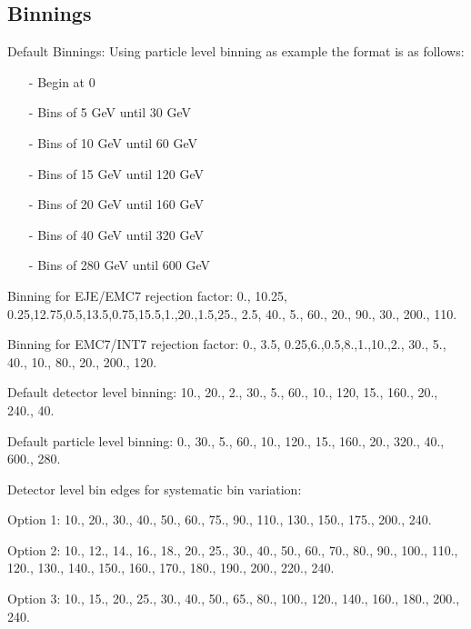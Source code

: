 \documentclass[ALICE]{ALICE_analysis_notes}
\begin{document}
\begin{appendix}
\newpage

\section{Binnings}
\label{sec:appendixSysBinVar}

Default Binnings:
Using particle level binning as example the format is as follows:
\begin{itemize}
    \item[-] Begin at 0
    \item[-] Bins of 5 GeV until 30 GeV
    \item[-] Bins of 10 GeV until 60 GeV
    \item[-] Bins of 15 GeV until 120 GeV
    \item[-] Bins of 20 GeV until 160 GeV
    \item[-] Bins of 40 GeV until 320 GeV
    \item[-] Bins of 280 GeV until 600 GeV
\end{itemize}

Binning for EJE/EMC7 rejection factor:
0., {{10.25, 0.25},{12.75,0.5},{13.5,0.75},{15.5,1.},{20.,1.5},{25., 2.5}, {40., 5.}, {60., 20.}, {90., 30.}, {200., 110.}}

\bigskip

Binning for EMC7/INT7 rejection factor:
0., {{3.5, 0.25},{6.,0.5},{8.,1.},{10.,2.}, {30., 5.}, {40., 10.}, {80., 20.}, {200., 120.}}

\bigskip

Default detector level binning:
10., {{20., 2.}, {30., 5.}, {60., 10.}, {120, 15.}, {160., 20.}, {240., 40.}}

\bigskip

Default particle level binning:
0., {{30., 5.}, {60., 10.}, {120., 15.}, {160., 20.}, {320., 40.}, {600., 280.}}

\bigskip

Detector level bin edges for systematic bin variation:

\bigskip

Option 1:
10., 20., 30., 40., 50., 60., 75., 90., 110., 130., 150., 175., 200., 240.

\bigskip

Option 2:
10., 12., 14., 16., 18., 20., 25., 30., 40., 50., 60., 70., 80., 90., 100., 110., 120., 130., 140., 150., 160., 170., 180., 190., 200., 220., 240.

\bigskip

Option 3:
10., 15., 20., 25., 30., 40., 50., 65., 80., 100., 120., 140., 160., 180., 200., 240.


\end{appendix}
\end{document}
